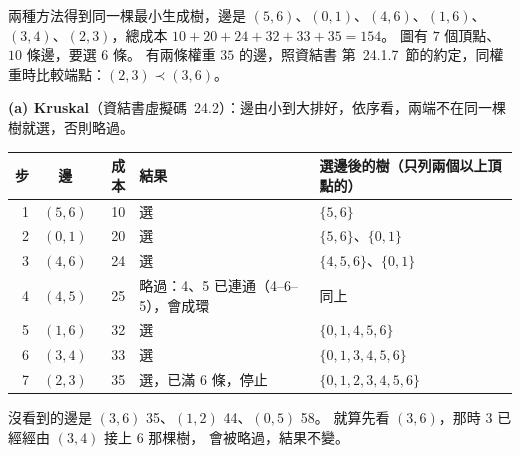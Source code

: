 \begin{pastsoln}
兩種方法得到同一棵最小生成樹，邊是 $(5,6)$、$(0,1)$、$(4,6)$、$(1,6)$、$(3,4)$、$(2,3)$，總成本
$10 + 20 + 24 + 32 + 33 + 35 = 154$。 圖有 $7$ 個頂點、$10$ 條邊，要選 $6$ 條。 有兩條權重 $35$ 的邊，照資結書
第~24.1.7~節的約定，同權重時比較端點：$(2,3) \prec (3,6)$。

\textbf{(a) Kruskal}（資結書虛擬碼~24.2）：邊由小到大排好，依序看，兩端不在同一棵樹就選，否則略過。
\begin{center}
\small
\begin{tabular}{rcrll}
\toprule
步 & 邊 & 成本 & 結果 & 選邊後的樹（只列兩個以上頂點的） \\
\midrule
1 & $(5,6)$ & 10 & 選 & $\{5,6\}$ \\
2 & $(0,1)$ & 20 & 選 & $\{5,6\}$、$\{0,1\}$ \\
3 & $(4,6)$ & 24 & 選 & $\{4,5,6\}$、$\{0,1\}$ \\
4 & $(4,5)$ & 25 & 略過：4、5 已連通（4--6--5），會成環 & 同上 \\
5 & $(1,6)$ & 32 & 選 & $\{0,1,4,5,6\}$ \\
6 & $(3,4)$ & 33 & 選 & $\{0,1,3,4,5,6\}$ \\
7 & $(2,3)$ & 35 & 選，已滿 $6$ 條，停止 & $\{0,1,2,3,4,5,6\}$ \\
\bottomrule
\end{tabular}
\end{center}
沒看到的邊是 $(3,6)$ 35、$(1,2)$ 44、$(0,5)$ 58。 就算先看 $(3,6)$，那時 $3$ 已經經由 $(3,4)$ 接上 $6$ 那棵樹，
會被略過，結果不變。


\end{pastsoln}
